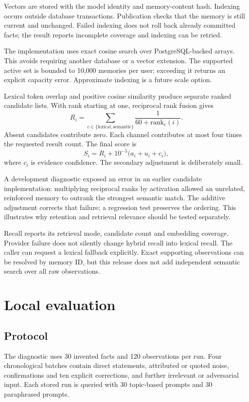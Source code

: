 \documentclass[11pt]{article}
\begin{document}
Vectors are stored with the model identity and memory-content hash. Indexing occurs outside database transactions. Publication checks that the memory is still current and unchanged. Failed indexing does not roll back already committed facts; the result reports incomplete coverage and indexing can be retried.

The implementation uses exact cosine search over PostgreSQL-backed arrays. This avoids requiring another database or a vector extension. The supported active set is bounded to 10,000 memories per user; exceeding it returns an explicit capacity error. Approximate indexing is a future scale option.

Lexical token overlap and positive cosine similarity produce separate ranked candidate lists. With rank starting at one, reciprocal rank fusion gives
\[
R_i=\sum_{c \in \{\mathrm{lexical},\mathrm{semantic}\}}
\frac{1}{60+\mathrm{rank}_c(i)}.
\]
Absent candidates contribute zero. Each channel contributes at most four times the requested result count. The final score is
\[
S_i=R_i+10^{-5}\bigl(a_i+u_i+c_i\bigr),
\]
where $c_i$ is evidence confidence. The secondary adjustment is deliberately small.

A development diagnostic exposed an error in an earlier candidate implementation: multiplying reciprocal ranks by activation allowed an unrelated, reinforced memory to outrank the strongest semantic match. The additive adjustment corrects that failure; a regression test preserves the ordering. This illustrates why retention and retrieval relevance should be tested separately.

Recall reports its retrieval mode, candidate count and embedding coverage. Provider failure does not silently change hybrid recall into lexical recall. The caller can request a lexical fallback explicitly. Exact supporting observations can be resolved by memory ID, but this release does not add independent semantic search over all raw observations.

\section{Local evaluation}
\subsection{Protocol}
The diagnostic uses 30 invented facts and 120 observations per run. Four chronological batches contain direct statements, attributed or quoted noise, confirmations and ten explicit corrections, and further irrelevant or adversarial input. Each stored run is queried with 30 topic-based prompts and 30 paraphrased prompts.
\end{document}
